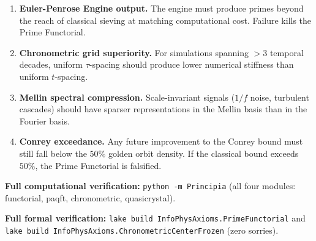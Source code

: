 \begin{enumerate}
\item \textbf{Euler-Penrose Engine output.}  The engine must produce primes beyond the reach of classical sieving at matching computational cost.  Failure kills the Prime Functorial.

\item \textbf{Chronometric grid superiority.}  For simulations spanning $>3$ temporal decades, uniform $\tau$-spacing should produce lower numerical stiffness than uniform $t$-spacing.

\item \textbf{Mellin spectral compression.}  Scale-invariant signals ($1/f$ noise, turbulent cascades) should have sparser representations in the Mellin basis than in the Fourier basis.

\item \textbf{Conrey exceedance.}  Any future improvement to the Conrey bound must still fall below the $50\%$ golden orbit density.  If the classical bound exceeds $50\%$, the Prime Functorial is falsified.
\end{enumerate}

\noindent\textbf{Full computational verification:} \texttt{python -m Principia} (all four modules: functorial, paqft, chronometric, quasicrystal).

\noindent\textbf{Full formal verification:} \texttt{lake build InfoPhysAxioms.PrimeFunctorial} and \texttt{lake build InfoPhysAxioms.ChronometricCenterFrozen} (zero sorries).
